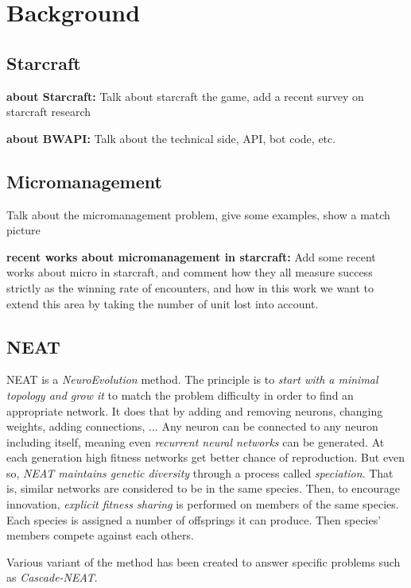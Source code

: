 \section{Background}\label{section:literature-review}

\subsection{Starcraft}

{\bf about Starcraft:} Talk about starcraft the game, add a recent
survey on starcraft research

{\bf about BWAPI:} Talk about the technical side, API, bot code, etc.

\subsection{Micromanagement}

Talk about the micromanagement problem, give some examples, show a
match picture

{\bf recent works about micromanagement in starcraft:} Add some recent
works about micro in starcraft, and comment how they all measure
success strictly as the winning rate of encounters, and how in this
work we want to extend this area by taking the number of unit lost
into account.

\subsection{NEAT}

NEAT is a \emph{NeuroEvolution} method. The principle is to
\emph{start with a minimal topology and grow it} to match the problem
difficulty in order to find an appropriate network.  It does that by
adding and removing neurons, changing weights, adding connections, ...
Any neuron can be connected to any neuron including itself, meaning
even \emph{recurrent neural networks} can be generated.  At each
generation high fitness networks get better chance of
reproduction. But even so, \emph{NEAT maintains genetic diversity}
through a process called \emph{speciation}. That is, similar networks
are considered to be in the same species. Then, to encourage
innovation, \emph{explicit fitness sharing} is performed on members of
the same species. Each species is assigned a number of offsprings it
can produce. Then species' members compete against each
others. \cite{StMi02}

Various variant of the method has been created to answer specific
problems such as \emph{Cascade-NEAT}.


